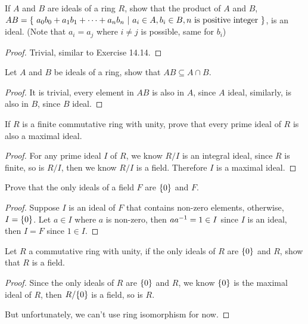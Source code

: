\documentclass[../main.tex]{subfiles}
\begin{document}
\setcounter{exercise}{15}
\begin{exercise}
  If $A$ and $B$ are ideals of a ring $R$, show that the product of
  $A$ and $B$, $AB = \{ \ a_0b_0 + a_1b_1 + \cdots + a_nb_n \ | \ a_i \in A, b_i \in B, n \text{ is positive integer} \ \}$,
  is an ideal. (Note that $a_i = a_j$ where $i \neq j$ is possible, same for $b_i$)
\end{exercise}
\begin{proof}
  Trivial, similar to Exercise 14.14.
\end{proof}

\setcounter{exercise}{17}
\begin{exercise}
  Let $A$ and $B$ be ideals of a ring, show that $AB \subseteq A \cap B$.
\end{exercise}
\begin{proof}
  It is trivial, every element in $AB$ is also in $A$, since $A$ ideal,
  similarly, is also in $B$, since $B$ ideal.
\end{proof}

\setcounter{exercise}{21}
\begin{exercise}
  If $R$ is a finite commutative ring with unity, prove that every prime ideal of
  $R$ is also a maximal ideal.
\end{exercise}
\begin{proof}
  For any prime ideal $I$ of $R$, we know $R/I$ is an integral ideal,
  since $R$ is finite, so is $R/I$, then we know $R/I$ is a field.
  Therefore $I$ is a maximal ideal.
\end{proof}

\setcounter{exercise}{38}
\begin{exercise}
  Prove that the only ideals of a field $F$ are $\{0\}$ and $F$.
\end{exercise}
\begin{proof}
  Suppose $I$ is an ideal of $F$ that contains non-zero elements,
  otherwise, $I = \{0\}$.
  Let $a \in I$ where $a$ is non-zero, then $aa^{-1} = 1 \in I$
  since $I$ is an ideal, then $I = F$ since $1 \in I$.
\end{proof}

\begin{exercise}
  Let $R$ a commutative ring with unity, if the only ideals of $R$
  are $\{0\}$ and $R$, show that $R$ is a field.
\end{exercise}
\begin{proof}
  Since the only ideals of $R$ are $\{0\}$ and $R$, we know $\{0\}$
  is the maximal ideal of $R$, then $R/\{0\}$ is a field, so is $R$.

  But unfortunately, we can't use ring isomorphism for now.
\end{proof}
\end{document}
